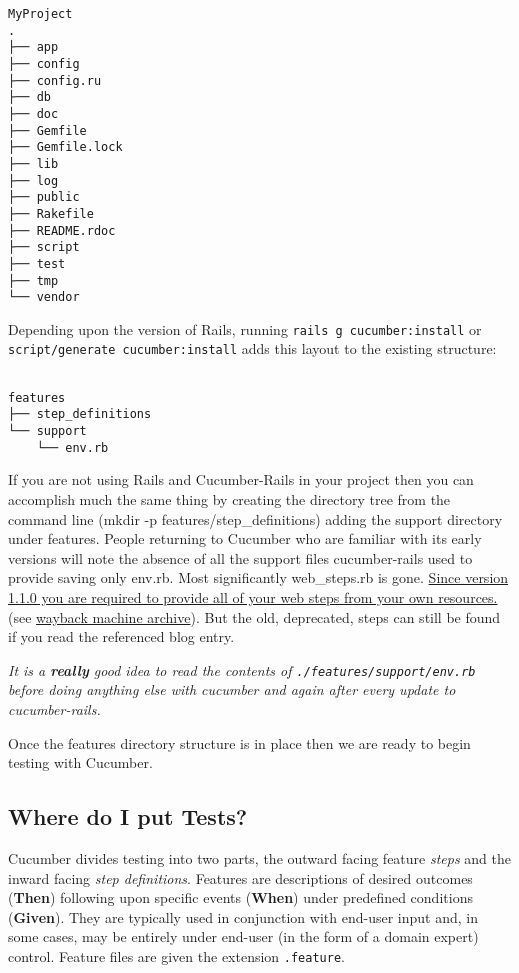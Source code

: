 \begin{verbatim}
MyProject
.
├── app
├── config
├── config.ru
├── db
├── doc
├── Gemfile
├── Gemfile.lock
├── lib
├── log
├── public
├── Rakefile
├── README.rdoc
├── script
├── test
├── tmp
└── vendor

\end{verbatim}
Depending upon the version of Rails, running \verb+rails g cucumber:install+ or \verb+script/generate cucumber:install+ adds this layout to the existing structure:
\begin{verbatim}

features
├── step_definitions
└── support
    └── env.rb

\end{verbatim}
If you are not using Rails and Cucumber-Rails in your project then you can accomplish much the same thing by creating the directory tree from the command line (mkdir -p features/step\_definitions) adding the support directory under features.  People returning to Cucumber who are familiar with its early versions will note the absence of all the support files cucumber-rails used to provide saving only env.rb.  Most significantly web\_steps.rb is gone.  \href{http://aslakhellesoy.com/post/11055981222/the-training-wheels-came-off}{Since version 1.1.0 you are required to provide all of your web steps from your own resources.} (see \href{http://web.archive.org/web/20130424133851/http://aslakhellesoy.com/post/11055981222/the-training-wheels-came-off}{wayback machine archive}).  But the old, deprecated, steps can still be found if you read the referenced blog entry.

\emph{ It is a \textbf{really} good idea to read the contents of \verb+./features/support/env.rb+ before doing anything else with cucumber and again after every update to cucumber-rails.}

Once the features directory structure is in place then we are ready to begin testing with Cucumber.

\subsection{Where do I put Tests?}

Cucumber divides testing into two parts, the outward facing feature \emph{steps} and the inward facing \emph{step definitions}.  Features are descriptions of desired outcomes (\textbf{Then}) following upon specific events (\textbf{When}) under predefined conditions (\textbf{Given}).  They are typically used in conjunction with end-user input and, in some cases, may be entirely under end-user (in the form of a domain expert) control. Feature files are given the extension \verb+.feature+.

